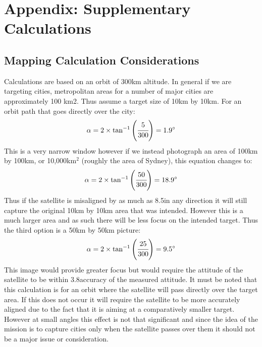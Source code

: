 \section{Appendix: Supplementary Calculations}

\subsection{Mapping Calculation Considerations} \label{app:mapping}
Calculations are based on an orbit of 300km altitude. In general if we are targeting cities, metropolitan areas for a number of major cities are approximately 100 km2.  Thus assume a target size of 10km by 10km.  For an orbit path that goes directly over the city:
\[
\alpha = 2\times \tan^{-1}\left(\cfrac{5}{300}\right) = 1.9\deg
\]
\noindent
This is a very narrow window however if we instead photograph an area of 100km by 100km, or 10,000km$^2$ (roughly the area of Sydney), this equation changes to:
\[
\alpha = 2\times \tan^{-1}\left(\cfrac{50}{300}\right) = 18.9\deg
\]
\noindent
Thus if the satellite is misaligned by as much as 8.5\deg in any direction it will still capture the original 10km by 10km area that was intended.  However this is a much larger area and as such there will be less focus on the intended target.  Thus the third option is a 50km by 50km picture:
\[
\alpha = 2\times \tan^{-1}\left(\cfrac{25}{300}\right) = 9.5\deg
\]
\noindent
This image would provide greater focus but would require the attitude of the satellite to be within 3.8\deg accuracy of the measured attitude. It must be noted that this calculation is for an orbit where the satellite will pass directly over the target area.  If this does not occur it will require the satellite to be more accurately aligned due to the fact that it is aiming at a comparatively smaller target.  However at small angles this effect is not that significant and since the idea of the mission is to capture cities only when the satellite passes over them it should not be a major issue or consideration.

